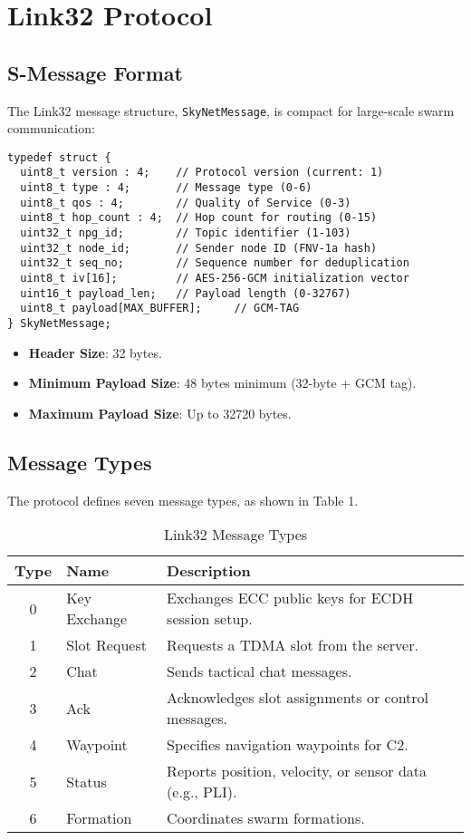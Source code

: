 \documentclass{article}
\begin{document}
\section{Link32 Protocol}

\subsection{S-Message Format}
The Link32 message structure, \texttt{SkyNetMessage}, is compact for large-scale swarm
communication:
\begin{lstlisting}
typedef struct {
  uint8_t version : 4;    // Protocol version (current: 1)
  uint8_t type : 4;       // Message type (0-6)
  uint8_t qos : 4;        // Quality of Service (0-3)
  uint8_t hop_count : 4;  // Hop count for routing (0-15)
  uint32_t npg_id;        // Topic identifier (1-103)
  uint32_t node_id;       // Sender node ID (FNV-1a hash)
  uint32_t seq_no;        // Sequence number for deduplication
  uint8_t iv[16];         // AES-256-GCM initialization vector
  uint16_t payload_len;   // Payload length (0-32767)
  uint8_t payload[MAX_BUFFER];     // GCM-TAG
} SkyNetMessage;
\end{lstlisting}
\begin{itemize}
    \item \textbf{Header Size}: 32 bytes.
    \item \textbf{Minimum Payload Size}: 48 bytes minimum (32-byte + GCM tag).
    \item \textbf{Maximum Payload Size}: Up to 32720 bytes.
\end{itemize}

\newpage
\subsection{Message Types}
The protocol defines seven message types, as shown in Table 1.

\begin{table}[h]
\centering
\caption{Link32 Message Types}
\begin{tabular}{clp{8cm}}
\hline
\textbf{Type} & \textbf{Name} & \textbf{Description} \\
\hline
0 & Key Exchange & Exchanges ECC public keys for ECDH session setup. \\
1 & Slot Request & Requests a TDMA slot from the server. \\
2 & Chat         & Sends tactical chat messages. \\
3 & Ack          & Acknowledges slot assignments or control messages. \\
4 & Waypoint     & Specifies navigation waypoints for C2. \\
5 & Status       & Reports position, velocity, or sensor data (e.g., PLI). \\
6 & Formation    & Coordinates swarm formations. \\
\hline
\end{tabular}
\end{table}
\end{document}
